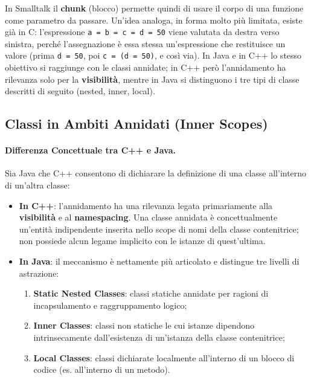 \documentclass[12pt]{extarticle}
\begin{document}
\noindent In Smalltalk il \textbf{chunk} (blocco) permette quindi di usare il corpo di una funzione come parametro da passare. Un'idea analoga, in forma molto più limitata, esiste già in C: l'espressione \texttt{a = b = c = d = 50} viene valutata da destra verso sinistra, perché l'assegnazione è essa stessa un'espressione che restituisce un valore (prima \texttt{d = 50}, poi \texttt{c = (d = 50)}, e così via).
In Java e in C++ lo stesso obiettivo si raggiunge con le classi annidate; in C++ però l'annidamento ha rilevanza solo per la \textbf{visibilità}, mentre in Java si distinguono i tre tipi di classe descritti di seguito (nested, inner, local).

\subsection{Classi in Ambiti Annidati (Inner Scopes)}

\paragraph{Differenza Concettuale tra C++ e Java.}
Sia Java che C++ consentono di dichiarare la definizione di una classe all'interno di un'altra classe:
\begin{itemize}
    \item \textbf{In C++}: l'annidamento ha una rilevanza legata primariamente alla \textbf{visibilità} e al \textbf{namespacing}. Una classe annidata è concettualmente un'entità indipendente inserita nello scope di nomi della classe contenitrice; non possiede alcun legame implicito con le istanze di quest'ultima.
    \item \textbf{In Java}: il meccanismo è nettamente più articolato e distingue tre livelli di astrazione:
    \begin{enumerate}
        \item \textbf{Static Nested Classes}: classi statiche annidate per ragioni di incapsulamento e raggruppamento logico;
        \item \textbf{Inner Classes}: classi non statiche le cui istanze dipendono intrinsecamente dall'esistenza di un'istanza della classe contenitrice;
        \item \textbf{Local Classes}: classi dichiarate localmente all'interno di un blocco di codice (es. all'interno di un metodo).
    \end{enumerate}
\end{itemize}
\end{document}

